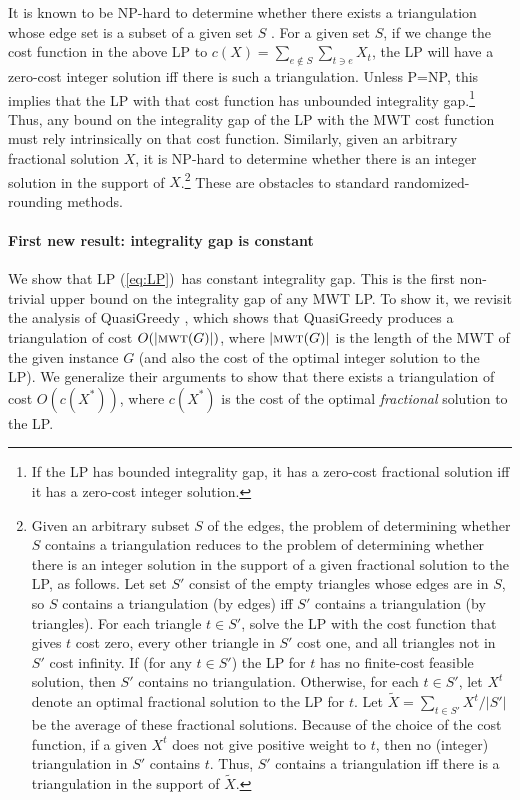 \documentclass[final]{siamltex}
\newcommand{\refLP}{(\ref{eq:LP})\xspace}
\newcommand{\MWT}{\text{\sc mwt}}
\newcommand{\mwt}{\MWT}
\newcommand{\cost}{c}
\newcommand{\edge}{e}
\newcommand{\graph}{G}
\newcommand{\tri}{t}  \newcommand{\vertex}{v}
\newcommand{\fracTriang}{X}
\begin{document}
It is known to be NP-hard to determine whether there exists a triangulation
whose edge set is a subset of a given set $S$
\cite{lloyd77triangulations}.
For a given set $S$, if we change the cost function in the above LP to
$\cost(\fracTriang) = \sum_{\edge\notin S} \sum_{\tri\ni \edge} \fracTriang_\tri$,
the LP will have a zero-cost integer solution iff there is such a triangulation.
Unless P=NP, this implies that the LP with that cost function has unbounded integrality gap.\footnote
{If the LP has bounded integrality gap,  it has a zero-cost fractional solution iff it has a zero-cost integer solution.}
Thus, any bound on the integrality gap of the LP 
with the MWT cost function must rely intrinsically on that cost function.
Similarly,  given an arbitrary fractional solution $X$, it is NP-hard to determine whether there is an integer solution in the support of $X$.\footnote
{Given an arbitrary subset $S$ of the edges, the problem of determining whether $S$
contains a triangulation reduces to the problem of determining whether there is an integer solution in the support of a given fractional solution to the LP, as follows.  
Let set $S'$ consist of the empty triangles whose edges are in $S$,
so $S$ contains a triangulation (by edges) 
iff $S'$ contains a triangulation (by triangles).
For each triangle $\tri\in S'$, solve the LP with the cost function
that gives $\tri$ cost zero, every other triangle in $S'$ cost one,
and all triangles not in $S'$ cost infinity.  
If (for any $\tri\in S'$) the LP for $\tri$ has no finite-cost feasible solution,
then $S'$ contains no triangulation.  Otherwise, for each $\tri\in S'$,
let $X^\tri$ denote an optimal fractional solution to the LP for $\tri$.  
Let $\widetilde X = \sum_{\tri\in S'} X^\tri/|S'|$ be the average of these fractional solutions.
Because of the choice of the cost function, if a given $X^\tri$ does not give positive weight to $\tri$, then no (integer) triangulation in $S'$ contains $\tri$.  Thus, $S'$ contains a triangulation iff there is a triangulation in the support of $\widetilde X$.}
These are obstacles to standard randomized-rounding methods.



\paragraph{First new result: integrality gap is constant}
We show that LP \refLP\ has constant integrality gap.  
This is the first non-trivial upper bound on the integrality gap of any MWT LP.
To show it, we revisit the analysis of {\sc QuasiGreedy} \cite{krznaric1998quasi},
which shows that {\sc QuasiGreedy} produces a triangulation
of cost $O(|\mwt(\graph)|)$, where $|\mwt(\graph)|$ is the length of the MWT 
of the given instance $\graph$
(and also the cost of the optimal integer solution to the LP).
We generalize their arguments to show that there exists a triangulation
of cost $O(\cost(\fracTriang^*))$, where $\cost(\fracTriang^*)$ is the cost of the optimal
{\em fractional} solution to the LP.
\end{document}
